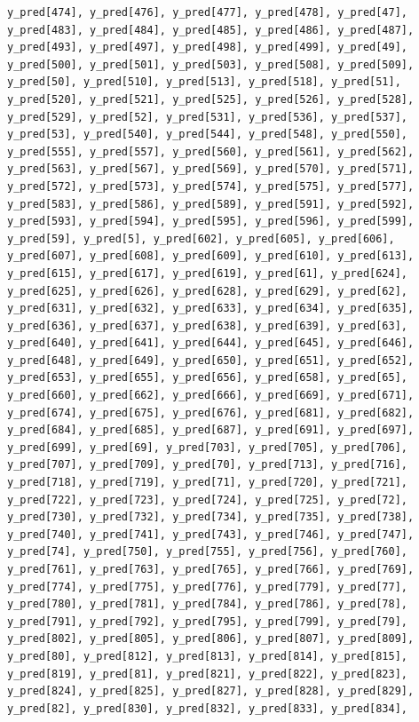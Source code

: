\documentclass[
  letterpaper,
  DIV=11,
  numbers=noendperiod]{scrartcl}
\begin{document}
\begin{verbatim}
y_pred[474], y_pred[476], y_pred[477], y_pred[478], y_pred[47],
y_pred[483], y_pred[484], y_pred[485], y_pred[486], y_pred[487],
y_pred[493], y_pred[497], y_pred[498], y_pred[499], y_pred[49],
y_pred[500], y_pred[501], y_pred[503], y_pred[508], y_pred[509],
y_pred[50], y_pred[510], y_pred[513], y_pred[518], y_pred[51],
y_pred[520], y_pred[521], y_pred[525], y_pred[526], y_pred[528],
y_pred[529], y_pred[52], y_pred[531], y_pred[536], y_pred[537],
y_pred[53], y_pred[540], y_pred[544], y_pred[548], y_pred[550],
y_pred[555], y_pred[557], y_pred[560], y_pred[561], y_pred[562],
y_pred[563], y_pred[567], y_pred[569], y_pred[570], y_pred[571],
y_pred[572], y_pred[573], y_pred[574], y_pred[575], y_pred[577],
y_pred[583], y_pred[586], y_pred[589], y_pred[591], y_pred[592],
y_pred[593], y_pred[594], y_pred[595], y_pred[596], y_pred[599],
y_pred[59], y_pred[5], y_pred[602], y_pred[605], y_pred[606],
y_pred[607], y_pred[608], y_pred[609], y_pred[610], y_pred[613],
y_pred[615], y_pred[617], y_pred[619], y_pred[61], y_pred[624],
y_pred[625], y_pred[626], y_pred[628], y_pred[629], y_pred[62],
y_pred[631], y_pred[632], y_pred[633], y_pred[634], y_pred[635],
y_pred[636], y_pred[637], y_pred[638], y_pred[639], y_pred[63],
y_pred[640], y_pred[641], y_pred[644], y_pred[645], y_pred[646],
y_pred[648], y_pred[649], y_pred[650], y_pred[651], y_pred[652],
y_pred[653], y_pred[655], y_pred[656], y_pred[658], y_pred[65],
y_pred[660], y_pred[662], y_pred[666], y_pred[669], y_pred[671],
y_pred[674], y_pred[675], y_pred[676], y_pred[681], y_pred[682],
y_pred[684], y_pred[685], y_pred[687], y_pred[691], y_pred[697],
y_pred[699], y_pred[69], y_pred[703], y_pred[705], y_pred[706],
y_pred[707], y_pred[709], y_pred[70], y_pred[713], y_pred[716],
y_pred[718], y_pred[719], y_pred[71], y_pred[720], y_pred[721],
y_pred[722], y_pred[723], y_pred[724], y_pred[725], y_pred[72],
y_pred[730], y_pred[732], y_pred[734], y_pred[735], y_pred[738],
y_pred[740], y_pred[741], y_pred[743], y_pred[746], y_pred[747],
y_pred[74], y_pred[750], y_pred[755], y_pred[756], y_pred[760],
y_pred[761], y_pred[763], y_pred[765], y_pred[766], y_pred[769],
y_pred[774], y_pred[775], y_pred[776], y_pred[779], y_pred[77],
y_pred[780], y_pred[781], y_pred[784], y_pred[786], y_pred[78],
y_pred[791], y_pred[792], y_pred[795], y_pred[799], y_pred[79],
y_pred[802], y_pred[805], y_pred[806], y_pred[807], y_pred[809],
y_pred[80], y_pred[812], y_pred[813], y_pred[814], y_pred[815],
y_pred[819], y_pred[81], y_pred[821], y_pred[822], y_pred[823],
y_pred[824], y_pred[825], y_pred[827], y_pred[828], y_pred[829],
y_pred[82], y_pred[830], y_pred[832], y_pred[833], y_pred[834],

\end{verbatim}
\end{document}
